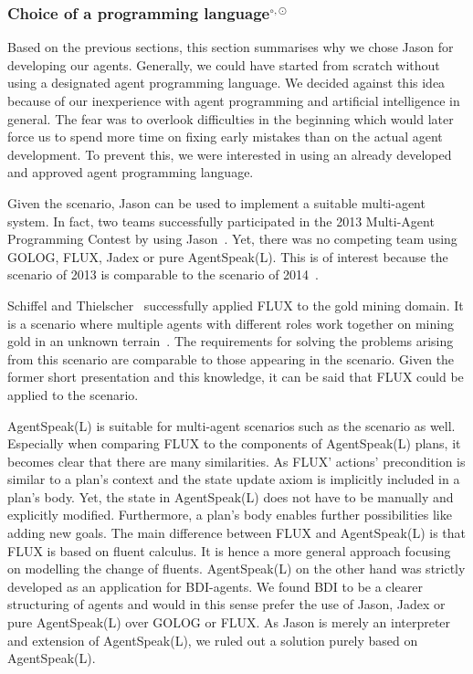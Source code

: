 \subsubsection[Choice of a programming language]{Choice of a programming language$^{\circ,\odot}$}\label{fun:apl_choice}
Based on the previous sections, this section summarises why we chose Jason for developing our agents.
Generally, we could have started from scratch without using a designated agent programming language.
We decided against this idea because of our inexperience with agent programming and artificial intelligence in general.
The fear was to overlook difficulties in the beginning which would later force us to spend more time on fixing early mistakes than on the actual agent development.
To prevent this, we were interested in using an already developed and approved agent programming language.

Given the \mars scenario, Jason can be used to implement a suitable multi-agent system.
In fact, two teams successfully participated in the 2013 Multi-Agent Programming Contest by using Jason~\cite{ahlbrecht_multi_2013}. %
Yet, there was no competing team using GOLOG, FLUX, Jadex or pure AgentSpeak(L).
This is of interest because the scenario of 2013 is comparable to the scenario of 2014~\cite{ahlbrecht_mapc_2014}. %

Schiffel and Thielscher~\cite{schiffel_multi-agent_2007} successfully applied FLUX to the gold mining domain.
It is a scenario where multiple agents with different roles work together on mining gold in an unknown terrain~\cite{schiffel_multi-agent_2007}.
The requirements for solving the problems arising from this scenario are comparable to those appearing in the \mars scenario.
Given the former short presentation and this knowledge, it can be said that FLUX could be applied to the \mars scenario.

AgentSpeak(L) is suitable for multi-agent scenarios such as the \mars scenario as well.
Especially when comparing FLUX to the components of AgentSpeak(L) plans, it becomes clear that there are many similarities.
As FLUX' actions' precondition is similar to a plan's context and the state update axiom is implicitly included in a plan's body.
Yet, the state in AgentSpeak(L) does not have to be manually and explicitly modified.
Furthermore, a plan's body enables further possibilities like adding new goals.
The main difference between FLUX and AgentSpeak(L) is that FLUX is based on fluent calculus.
It is hence a more general approach focusing on modelling the change of fluents.
AgentSpeak(L) on the other hand was strictly developed as an application for BDI-agents.
We found BDI to be a clearer structuring of agents and would in this sense prefer the use of Jason, Jadex or pure AgentSpeak(L) over GOLOG or FLUX.
As Jason is merely an interpreter and extension of AgentSpeak(L), we ruled out a solution purely based on AgentSpeak(L).

